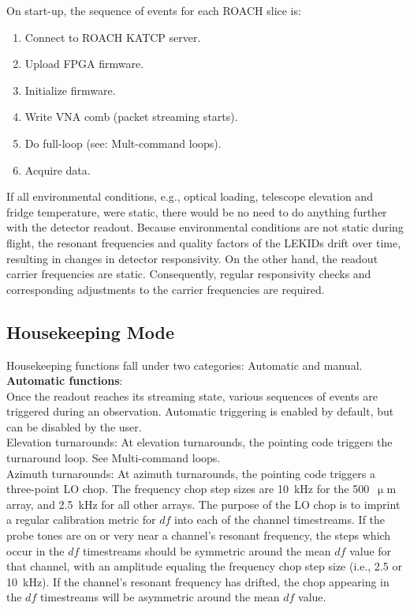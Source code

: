 On start-up, the sequence of events for each ROACH slice is:
\begin{enumerate}
 \item  Connect to ROACH KATCP server.
 \item  Upload FPGA firmware.
 \item  Initialize firmware.
 \item  Write VNA comb (packet streaming starts).
 \item  Do full-loop (see: Mult-command loops).
 \item  Acquire data.
\end{enumerate}

If all environmental conditions, e.g., optical loading, telescope elevation and fridge temperature, were static, there would be no need to do anything further with the detector readout. Because environmental conditions are not static during flight, the resonant frequencies and quality factors of the LEKIDs drift over time, resulting in changes in detector responsivity. On the other hand, the readout carrier frequencies are static. Consequently, regular responsivity checks and corresponding adjustments to the carrier frequencies are required.

\subsection{Housekeeping Mode}
Housekeeping functions fall under two categories: Automatic and manual.\\

\noindent \textbf{Automatic functions}:\\
Once the readout reaches its streaming state, various sequences of events are triggered during an observation. Automatic triggering is enabled by default, but can be disabled by the user.\\

Elevation turnarounds: At elevation turnarounds, the pointing code triggers the turnaround loop. See Multi-command loops.\\

Azimuth turnarounds: At azimuth turnarounds, the pointing code triggers a three-point LO chop. The frequency chop step sizes are 10~kHz for the 500~$\upmu$m array, and 2.5~kHz for all other arrays. The purpose of the LO chop is to imprint a regular calibration metric for $df$ into each of the channel timestreams. If the probe tones are on or very near a channel’s resonant frequency, the steps which occur in the $df$ timestreams should be symmetric around the mean $df$ value for that channel, with an amplitude equaling the frequency chop step size (i.e., 2.5 or 10~kHz). If the channel's resonant frequency has drifted, the chop appearing in the $df$ timestreams will be asymmetric around the mean $df$ value.\\


